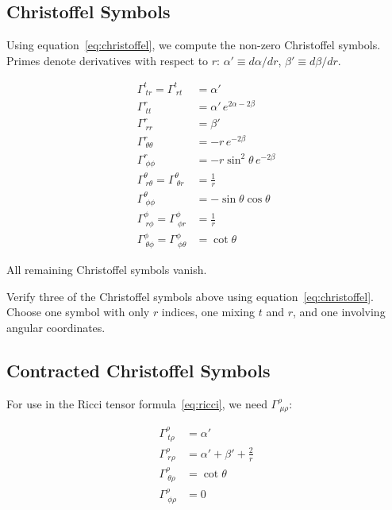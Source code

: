 \documentclass[12pt]{article}
\theoremstyle{definition}
\theoremstyle{remark}
\begin{document}
\subsection{Christoffel Symbols}

Using equation~\eqref{eq:christoffel}, we compute the non-zero Christoffel symbols. Primes denote derivatives with respect to $r$: $\alpha' \equiv d\alpha/dr$, $\beta' \equiv d\beta/dr$.

\begin{align}
  \Gamma^{t}_{\ tr} = \Gamma^{t}_{\ rt} &= \alpha' \\[4pt]
  \Gamma^{r}_{\ tt} &= \alpha'\,e^{2\alpha-2\beta} \\[4pt]
  \Gamma^{r}_{\ rr} &= \beta' \\[4pt]
  \Gamma^{r}_{\ \theta\theta} &= -r\,e^{-2\beta} \\[4pt]
  \Gamma^{r}_{\ \phi\phi} &= -r\sin^{2}\theta\,e^{-2\beta} \\[4pt]
  \Gamma^{\theta}_{\ r\theta} = \Gamma^{\theta}_{\ \theta r} &= \frac{1}{r} \\[4pt]
  \Gamma^{\theta}_{\ \phi\phi} &= -\sin\theta\cos\theta \\[4pt]
  \Gamma^{\phi}_{\ r\phi} = \Gamma^{\phi}_{\ \phi r} &= \frac{1}{r} \\[4pt]
  \Gamma^{\phi}_{\ \theta\phi} = \Gamma^{\phi}_{\ \phi\theta} &= \cot\theta
\end{align}

All remaining Christoffel symbols vanish.

\begin{exbox}[label=ex:christoffel]
  Verify three of the Christoffel symbols above using equation~\eqref{eq:christoffel}.
  Choose one symbol with only $r$ indices, one mixing $t$ and $r$, and one involving
  angular coordinates.
\end{exbox}

\subsection{Contracted Christoffel Symbols}

For use in the Ricci tensor formula~\eqref{eq:ricci}, we need $\Gamma^{\rho}_{\ \mu\rho}$:

\begin{align}
  \Gamma^{\rho}_{\ t\rho} &= \alpha' \\
  \Gamma^{\rho}_{\ r\rho} &= \alpha' + \beta' + \frac{2}{r} \\
  \Gamma^{\rho}_{\ \theta\rho} &= \cot\theta \\
  \Gamma^{\rho}_{\ \phi\rho} &= 0
\end{align}
\end{document}
